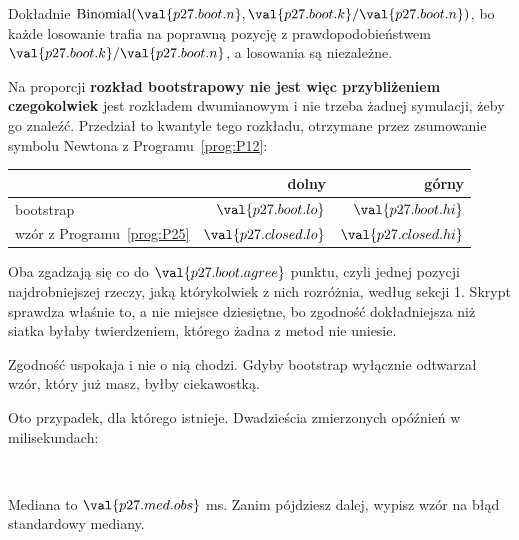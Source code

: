 \begin{fr}

Dokładnie $\mathrm{Binomial}(\val{p27.boot.n}, \val{p27.boot.k}/\val{p27.boot.n})$,
bo każde losowanie trafia na poprawną pozycję z prawdopodobieństwem
$\val{p27.boot.k}/\val{p27.boot.n}$, a losowania są niezależne.

Na proporcji \textbf{rozkład bootstrapowy nie jest więc przybliżeniem
czegokolwiek} \dash{} jest rozkładem dwumianowym i nie trzeba żadnej symulacji,
żeby go znaleźć. Przedział to kwantyle tego rozkładu, otrzymane przez
zsumowanie
symbolu Newtona z Programu~\ref{prog:P12}:

\begin{center}
\begin{tabular}{lrr}
\toprule
& dolny & górny \\
\midrule
bootstrap & $\val{p27.boot.lo}$ & $\val{p27.boot.hi}$ \\
wzór z Programu~\ref{prog:P25} & $\val{p27.closed.lo}$ &
  $\val{p27.closed.hi}$ \\
\bottomrule
\end{tabular}
\end{center}

Oba zgadzają się co do $\val{p27.boot.agree}$ punktu, czyli jednej pozycji
\dash{} najdrobniejszej rzeczy, jaką którykolwiek z nich rozróżnia, według
sekcji 1. Skrypt sprawdza właśnie to, a nie miejsce dziesiętne, bo zgodność
dokładniejsza niż siatka byłaby twierdzeniem, którego żadna z metod nie
uniesie.
\end{fr}

\begin{fr}
Zgodność uspokaja i nie o nią chodzi. Gdyby bootstrap wyłącznie odtwarzał
wzór, który już masz, byłby ciekawostką.

Oto przypadek, dla którego istnieje. Dwadzieścia zmierzonych opóźnień w
milisekundach:

\begin{center}
\\
\end{center}

Mediana to $\val{p27.med.obs}$ ms. Zanim pójdziesz dalej, wypisz wzór na błąd
standardowy mediany.
\dotline
\nextframe
\end{fr}

